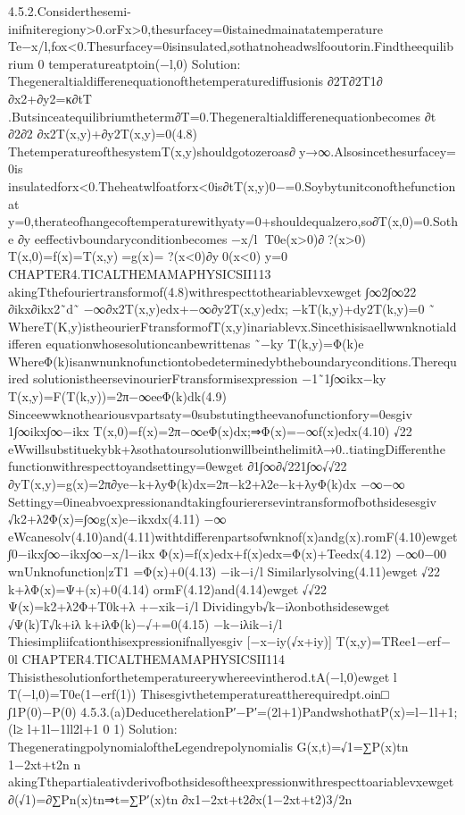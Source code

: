 {{{{4.5.2.Considerthesemi-inifniteregiony>0.orFx>0,thesurfacey=0istainedmainatatemperature
Te−x/l,fox<0.Thesurfacey=0isinsulated,sothatnoheadwslfooutorin.Findtheequilibrium
0
temperatureatptoin(−l,0)
Solution:
Thegeneraltialdifferenequationofthetemperaturediffusionis
∂2T∂2T1∂
∂x2+∂y2=κ∂tT
.Butsinceatequilibriumtheterm∂T=0.Thegeneraltialdifferenequationbecomes
∂t
∂2∂2
∂x2T(x,y)+∂y2T(x,y)=0(4.8)
ThetemperatureofthesystemT(x,y)shouldgotozeroas∂y→∞.Alsosincethesurfacey=0is

insulatedforx<0.Theheatwlfoatforx<0is∂tT(x,y)0−=0.Soybytunitconofthefunctionat
y=0,therateofhangecoftemperaturewithyaty=0+shouldequalzero,so∂T(x,0)=0.Sothe
∂y
eeffectivboundaryconditionbecomes
{−x/l{
T0e(x>0)∂?(x>0)
T(x,0)=f(x)=T(x,y)=g(x)=
?(x<0)∂y0(x<0)
y=0
CHAPTER4.TICALTHEMAMAPHYSICSII113
akingTthefouriertransformof(4.8)withrespecttotheariablevxewget
∫∞2∫∞22
∂ikx∂ikx2˜d˜
−∞∂x2T(x,y)edx+−∞∂y2T(x,y)edx;⇒−kT(k,y)+dy2T(k,y)=0
˜
WhereT(K,y)istheourierFtransformofT(x,y)inariablevx.Sincethisisaellwwnknotialdifferen
equationwhosesolutioncanbewrittenas
˜−ky
T(k,y)=Φ(k)e
WhereΦ(k)isanwnunknofunctiontobedeterminedybtheboundaryconditions.Therequired
solutionistheersevinourierFtransformisexpression
−1˜1∫∞ikx−ky
T(x,y)=F(T(k,y))=2π−∞eeΦ(k)dk(4.9)
Sinceewwknotheariousvpartsaty=0substutingtheevanofunctionfory=0esgiv
1∫∞ikx∫∞−ikx
T(x,0)=f(x)=2π−∞eΦ(x)dx;⇒Φ(x)=−∞f(x)edx(4.10)
√22
eWwillsubstituekybk+λsothatoursolutionwillbeinthelimitλ→0..tiatingDifferenthe
functionwithrespecttoyandsettingy=0ewget
∂1∫∞∂√221∫∞√√22
∂yT(x,y)=g(x)=2π∂ye−k+λyΦ(k)dx=2π−k2+λ2e−k+λyΦ(k)dx
−∞−∞
Settingy=0ineabvoexpressionandtakingfourierersevintransformofbothsidesesgiv
√k2+λ2Φ(x)=∫∞g(x)e−ikxdx(4.11)
−∞
eWcanesolv(4.10)and(4.11)withtdifferenpartsofwnknof(x)andg(x).romF(4.10)ewget
∫0−ikx∫∞−ikx∫∞−x/l−ikx
Φ(x)=f(x)edx+f(x)edx=Φ(x)+Teedx(4.12)
−∞0−00
wnUnknofunction|{z}T1
=Φ(x)+0(4.13)
−ik−i/l
Similarlysolving(4.11)ewget
√22
k+λΦ(x)=Ψ+(x)+0(4.14)
ormF(4.12)and(4.14)ewget
√√22
Ψ(x)=k2+λ2Φ+T0k+λ
+−xik−i/l
Dividingyb√k−iλonbothsidesewget
√Ψ(k)T√k+iλ
k+iλΦ(k)−√+=0(4.15)
−k−iλik−i/l
Thiesimpliifcationthisexpressionifnallyesgiv
[−x−iy(√x+iy)]
T(x,y)=TRee1−erf−
0l
CHAPTER4.TICALTHEMAMAPHYSICSII114
Thisisthesolutionforthetemperatureerywhereevintherod.tA(−l,0)ewget
l
T(−l,0)=T0e(1−erf(1))
Thisesgivthetemperatureattherequiredpt.oin□
∫1P(0)−P(0)
4.5.3.(a)DeducetherelationP′−P′=(2l+1)PandwshothatP(x)=l−1l+1;(l≥
l+1l−1ll2l+1
0
1)
Solution:
ThegeneratingpolynomialoftheLegendrepolynomialis
G(x,t)=√1=∑P(x)tn
1−2xt+t2n
n
akingTthepartialeativderivofbothsidesoftheexpressionwithrespecttoariablevxewget
∂(√1)=∂∑Pn(x)tn⇒t=∑P′(x)tn
∂x1−2xt+t2∂x(1−2xt+t2)3/2n
}}}}}}
